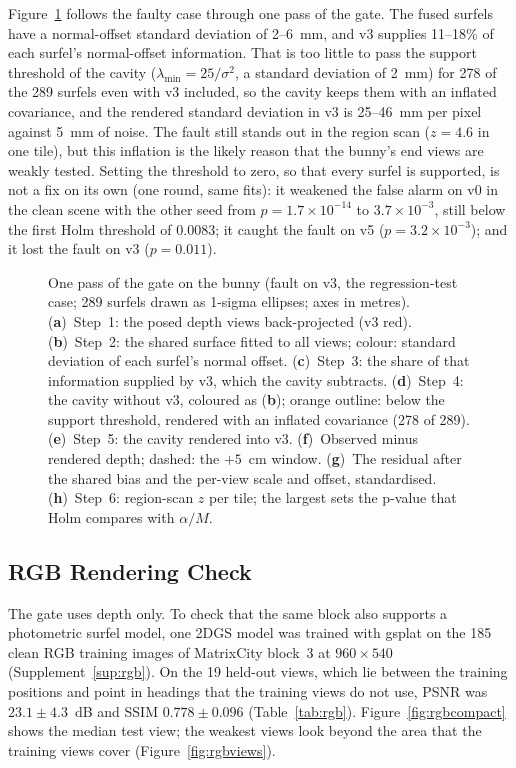 Figure~\ref{fig:bunnysteps} follows the faulty case through one pass of the gate. The fused surfels
have a normal-offset standard deviation of 2--6~mm, and v3 supplies 11--18\% of each surfel's
normal-offset information. That is too little to pass the support threshold of the cavity
($\lambda_{\min}=25/\sigma^2$, a standard deviation of 2~mm) for 278 of the 289 surfels even with v3
included, so the cavity keeps them with an inflated covariance, and the rendered standard deviation in
v3 is 25--46~mm per pixel against 5~mm of noise. The fault still stands out in the region scan
($z=4.6$ in one tile), but this inflation is the likely reason that the bunny's end views are weakly
tested. Setting the threshold to zero, so that every surfel is supported, is not a fix on its own (one round,
same fits): it weakened the false alarm on v0 in the clean scene with the other seed from
$p=1.7\times10^{-14}$ to $3.7\times10^{-3}$, still below the first Holm threshold of $0.0083$; it
caught the fault on v5 ($p=3.2\times10^{-3}$); and it lost the fault on v3 ($p=0.011$).

\begin{figure}[!htbp]
\centering

\caption{One pass of the gate on the bunny (fault on v3, the regression-test case; 289 surfels drawn as
1-sigma ellipses; axes in metres). (\textbf{a})~Step~1: the posed depth views back-projected (v3 red).
(\textbf{b})~Step~2: the shared surface fitted to all views; colour: standard deviation of each surfel's
normal offset. (\textbf{c})~Step~3: the share of that information supplied by v3, which the cavity
subtracts. (\textbf{d})~Step~4: the cavity without v3, coloured as (\textbf{b}); orange outline: below the
support threshold, rendered with an inflated covariance (278 of 289). (\textbf{e})~Step~5: the cavity
rendered into v3. (\textbf{f})~Observed minus rendered depth; dashed: the $+5$~cm window. (\textbf{g})~The
residual after the shared bias and the per-view scale and offset, standardised. (\textbf{h})~Step~6:
region-scan $z$ per tile; the largest sets the p-value that Holm compares with $\alpha/M$.}
\label{fig:bunnysteps}
\end{figure}

\FloatBarrier

\subsection{RGB Rendering Check}
\label{sec:results:rgb}
The gate uses depth only. To check that the same block also supports a photometric surfel model, one
2DGS model was trained with gsplat on the 185 clean RGB training images of MatrixCity block~3 at
$960\times540$ (Supplement~\ref{sup:rgb}). On the 19 held-out views, which lie between the training
positions and point in headings that the training views do not use, PSNR was $23.1\pm4.3$~dB and SSIM
$0.778\pm0.096$ (Table~\ref{tab:rgb}). Figure~\ref{fig:rgbcompact} shows the median test view; the
weakest views look beyond the area that the training views cover (Figure~\ref{fig:rgbviews}).

